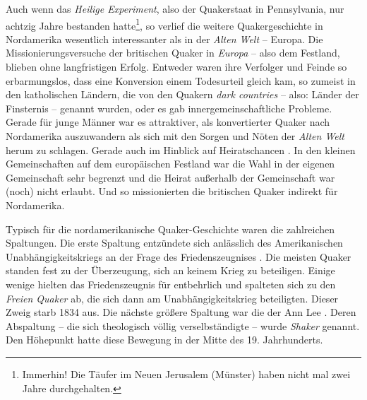 \medskip

Auch wenn das \textit{Heilige Experiment}, also der Quakerstaat in Pennsylvania,
nur achtzig Jahre
bestanden hatte\footnote{Immerhin! Die Täufer im Neuen Jerusalem (Münster)
  haben
nicht mal zwei Jahre durchgehalten.}, so verlief die weitere
Quakergeschichte in Nordamerika wesentlich interessanter als in der
\textit{Alten
Welt} -- Europa. Die Missionierungsversuche  der britischen
Quaker in
\textit{Europa}  -- also dem Festland, blieben ohne
langfristigen Erfolg.
Entweder waren ihre Verfolger  und Feinde so erbarmungslos,
dass eine
Konversion einem Todesurteil gleich kam, so zumeist in den katholischen
Ländern, die von den Quakern \textit{dark countries}  -- also: Länder der
Finsternis -- genannt wurden, oder es gab innergemeinschaftliche Probleme.
Gerade
für junge Männer war es attraktiver, als konvertierter Quaker nach Nordamerika
auszuwandern als sich mit den Sorgen und Nöten der \textit{Alten Welt} herum
zu
schlagen. Gerade auch im Hinblick auf Heiratschancen . In den
kleinen
Gemeinschaften auf dem europäischen Festland war die Wahl in der eigenen
Gemeinschaft sehr begrenzt und die Heirat außerhalb der Gemeinschaft war (noch)
nicht erlaubt. Und so missionierten die britischen Quaker indirekt für
Nordamerika.

\medskip

Typisch für die nordamerikanische Quaker-Geschichte waren die zahlreichen
Spaltungen. Die erste Spaltung  entzündete sich anlässlich des
Amerikanischen
Unabhängigkeitskriegs an der Frage des Friedenszeugnises
. Die meisten Quaker
standen fest zu der Überzeugung, sich an keinem Krieg  zu
beteiligen. Einige
wenige hielten das Friedenszeugnis für entbehrlich und spalteten sich zu den
\textit{Freien Quaker}   ab,
die sich dann am Unabhängigkeitskrieg 
beteiligten. Dieser Zweig starb 1834 aus. Die nächste größere Spaltung war die
der Ann Lee . Deren Abspaltung -- die sich theologisch
völlig verselbständigte --
wurde \textit{Shaker}  genannt. Den Höhepunkt hatte
diese Bewegung in der Mitte
des 19. Jahrhunderts.

\medskip

